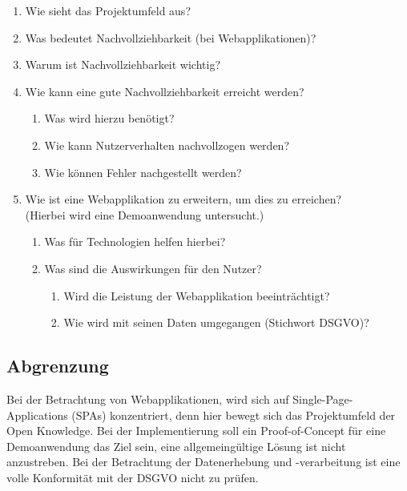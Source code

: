 \begin{enumerate}
	\item Wie sieht das Projektumfeld aus?
	\item Was bedeutet Nachvollziehbarkeit (bei Webapplikationen)?
	\item Warum ist Nachvollziehbarkeit wichtig?
	\item Wie kann eine gute Nachvollziehbarkeit erreicht werden?
	\begin{enumerate}
		\item Was wird hierzu benötigt?
		\item Wie kann Nutzerverhalten nachvollzogen werden?
		\item Wie können Fehler nachgestellt werden?
	\end{enumerate}
	\item Wie ist eine Webapplikation zu erweitern, um dies zu erreichen? \\ (Hierbei wird eine Demoanwendung untersucht.)
	\begin{enumerate}
		\item Was für Technologien helfen hierbei?
		\item Was sind die Auswirkungen für den Nutzer?
		\begin{enumerate}
			\item Wird die Leistung der Webapplikation beeinträchtigt?
			\item Wie wird mit seinen Daten umgegangen (Stichwort DSGVO)?
		\end{enumerate}
	\end{enumerate}
\end{enumerate}


\subsection{Abgrenzung}



Bei der Betrachtung von Webapplikationen, wird sich auf Single-Page-Applications (SPAs) konzentriert, denn hier bewegt sich das Projektumfeld der Open Knowledge. Bei der Implementierung soll ein Proof-of-Concept für eine Demoanwendung das Ziel sein, eine allgemeingültige Lösung ist nicht anzustreben. Bei der Betrachtung der Datenerhebung und -verarbeitung ist eine volle Konformität mit der DSGVO nicht zu prüfen.

